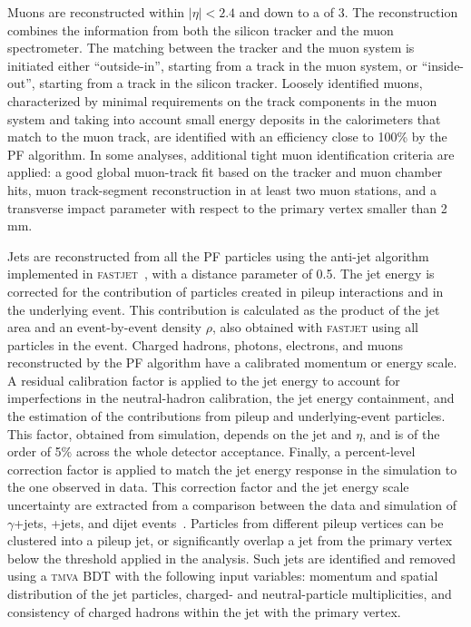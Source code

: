 \documentclass[11pt,twoside,a4paper,cmspaper,final,collab]{cms-tdr}
\begin{document}
Muons are reconstructed within $|\eta| < 2.4$ and down to a \PT of 3\GeV.
The reconstruction combines the information from both the silicon tracker and the
muon spectrometer.
The matching between the tracker and the muon system is initiated either ``outside-in'',
starting from a track in the muon system, or ``inside-out'', starting from a track
in the silicon tracker.
Loosely identified muons, characterized by minimal requirements
on the track components in the muon system and taking into account
small energy deposits in the calorimeters that match to the muon track,
are identified with an efficiency close to 100\% by the PF algorithm.
In some analyses, additional tight muon identification criteria are applied:
a good global muon-track fit based on the tracker and  muon chamber hits,
muon track-segment reconstruction in at least two muon stations,
and a transverse impact parameter with respect to the primary vertex smaller than 2\,mm.


Jets  are reconstructed from all the PF particles using the anti-\kt jet algorithm~\cite{Cacciari:2008gp}
implemented in \textsc{fastjet}~\cite{Cacciari:fastjet}, with a
distance parameter of 0.5.  %
The jet energy is corrected for the contribution of particles created in pileup interactions and in the underlying event.
This contribution is calculated as the product of the jet area and an event-by-event \PT density $\rho$,
also obtained with \textsc{fastjet} using all particles in the event.
Charged hadrons, photons, electrons, and muons reconstructed by the PF algorithm have a calibrated
momentum or energy scale.  A residual calibration factor is applied to
the jet energy to account for imperfections in the
neutral-hadron calibration, the jet energy containment, and the estimation of the contributions from
pileup and underlying-event particles.
This factor, obtained from simulation, depends on the jet \PT and $\eta$, and is of the order of 5\% across the whole detector acceptance.
Finally, a percent-level correction factor is applied to match
the jet energy response in the simulation to the one observed in data.
This correction factor and the jet energy scale uncertainty are extracted from a comparison between the data and
simulation of $\gamma$+jets, \cPZ+jets, and dijet events~\cite{CMS-JME-10-011}.
Particles from different pileup vertices can be clustered into a
pileup jet, or significantly overlap a jet from the primary vertex below the \PT threshold applied in the analysis.
Such jets are identified and removed using a \textsc{tmva} BDT with the following input variables:
momentum and spatial distribution of the jet particles, charged- and neutral-particle multiplicities,
and consistency of charged hadrons within the jet with the primary vertex.
\end{document}
